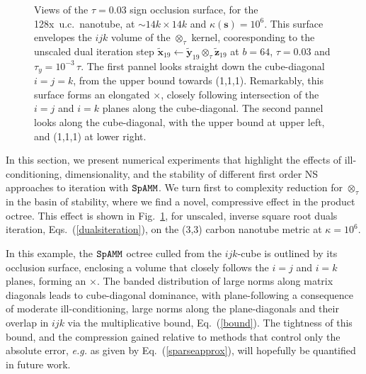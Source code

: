 \documentclass[letterpaper,twocolumn,amsmath,amsfont,amssymb,english,aps,jcp,preprintnumbers,groupaddress,nofootinbib,tightenlines,floatfix]{revtex4}
\newcommand{\mat}[1]{\boldsymbol{#1}}
\newcommand{\mmat}[1]{\widetilde{\boldsymbol{#1}}}
\newcommand{\ot}{  {\scriptstyle \otimes}_{ \tau } }
\theoremstyle{plain}
\theoremstyle{remark}
\theoremstyle{plain}
\begin{document}
 \begin{figure}[h] \label{markofzorro}
 \caption{Views of the $\tau =0.03$ sign occlusion surface, for the 
 128x~u.c.~nanotube, at $\sim {14k \times 14k}$ and $\kappa(\mat{s})=10^6$. 
 This surface envelopes the $ijk$ volume of the $\ot$ kernel,  
 cooresponding to the unscaled dual iteration step $\mmat{x}_{19} \leftarrow \mmat{y}_{19} \ot \mmat{z}_{19} $ at $b=64$, $\tau=0.03$ and
 $\tau_y=10^{-3} \, \tau $.  The first pannel looks straight down the cube-diagonal $i=j=k$, from the upper bound towards (1,1,1).
 Remarkably, this surface forms an elongated $\times$, closely following intersection of the $i=j$  and $i=k$ planes 
 along the cube-diagonal. The second pannel looks along the cube-diagonal, with the upper bound at upper left, and (1,1,1) at lower right.}
 \end{figure}

In this section, we present  numerical experiments that highlight the effects of 
ill-conditioning, dimensionality, and the stability of different first order NS approaches to iteration with $\tt SpAMM$. 
We turn first to complexity reduction for $\ot$ in the basin of stability,  where we find a novel, compressive 
effect in the product octree.  This effect is shown in Fig.~\ref{markofzorro},  
for unscaled, inverse square root duals iteration, Eqs.~(\ref{dualsiteration}), on the (3,3) carbon 
nanotube metric at $\kappa=10^6$.  

In this example, the $\tt SpAMM$ octree culled from the $ijk$-cube is outlined by its occlusion surface, enclosing 
a volume that closely follows the $i=j$ and $i=k$ planes, forming an $\times$.  The banded distribution
of large norms along  matrix diagonals leads to cube-diagonal dominance, with plane-following 
a consequence of moderate ill-conditioning,  large norms along the plane-diagonals and their overlap in $ijk$
via the multiplicative bound, Eq.~(\ref{bound}). The tightness of this bound, and the compression gained relative
to  methods that control only the absolute error, {\em e.g.} as given by Eq.~(\ref{sparseapprox}), will hopefully
be quantified in future work. 
\end{document}

